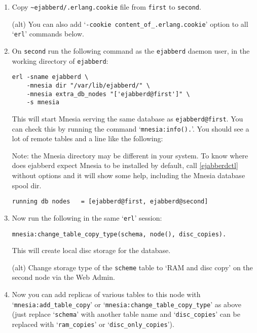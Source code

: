 \documentclass[a4paper,10pt]{book}
\newcommand{\node}[1]{\texttt{#1}}
\newcommand{\term}[1]{\texttt{#1}}
\newcommand{\shell}[1]{\texttt{#1}}
\newcommand{\ejabberd}{\texttt{ejabberd}}
\begin{document}
\begin{enumerate}
\item Copy \verb|~ejabberd/.erlang.cookie| file from \term{first} to
  \term{second}.

  (alt) You can also add `\verb|-cookie content_of_.erlang.cookie|'
  option to all `\shell{erl}' commands below.

\item On \term{second} run the following command as the \ejabberd{} daemon user,
  in the working directory of \ejabberd{}:

\begin{verbatim}
erl -sname ejabberd \
    -mnesia dir "/var/lib/ejabberd/" \
    -mnesia extra_db_nodes "['ejabberd@first']" \
    -s mnesia
\end{verbatim}

  This will start Mnesia serving the same database as \node{ejabberd@first}.
  You can check this by running the command `\verb|mnesia:info().|'. You
  should see a lot of remote tables and a line like the following:

  Note: the Mnesia directory may be different in your system.
  To know where does ejabberd expect Mnesia to be installed by default,
  call \ref{ejabberdctl} without options and it will show some help,
  including the Mnesia database spool dir.

\begin{verbatim}
running db nodes   = [ejabberd@first, ejabberd@second]
\end{verbatim}


\item Now run the following in the same `\shell{erl}' session:

\begin{verbatim}
mnesia:change_table_copy_type(schema, node(), disc_copies).
\end{verbatim}

  This will create local disc storage for the database.

  (alt) Change storage type of the \term{scheme} table to `RAM and disc
  copy' on the second node via the Web Admin.


\item Now you can add replicas of various tables to this node with
  `\verb|mnesia:add_table_copy|' or
  `\verb|mnesia:change_table_copy_type|' as above (just replace
  `\verb|schema|' with another table name and `\verb|disc_copies|'
  can be replaced with `\verb|ram_copies|' or
  `\verb|disc_only_copies|').


\end{enumerate}
\end{document}
